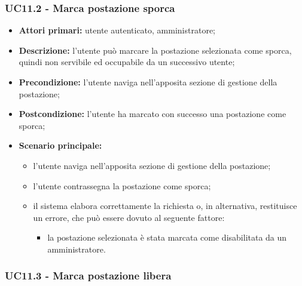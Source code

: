 \subsubsection{UC11.2 - Marca postazione sporca}

\begin{itemize}
\item \textbf{Attori primari:} utente autenticato, amministratore;
\item \textbf{Descrizione:} l’utente può marcare la postazione selezionata come sporca, quindi non servibile ed occupabile da un successivo utente;
\item \textbf{Precondizione:} l’utente naviga nell’apposita sezione di gestione della postazione; 
\item \textbf{Postcondizione:} l’utente ha marcato con successo una postazione come sporca;
\item \textbf{Scenario principale:} 
	\begin{itemize}
		\item l’utente naviga nell’apposita sezione di gestione della postazione;		
		\item l’utente contrassegna la postazione come sporca;
		\item il sistema elabora correttamente la richiesta o, in alternativa, restituisce un errore, che può essere dovuto al seguente fattore:
		\begin{itemize}
			\item la postazione selezionata è stata marcata come disabilitata da un amministratore.
		\end{itemize}
	\end{itemize}
\end{itemize}

\subsubsection{UC11.3 - Marca postazione libera}

